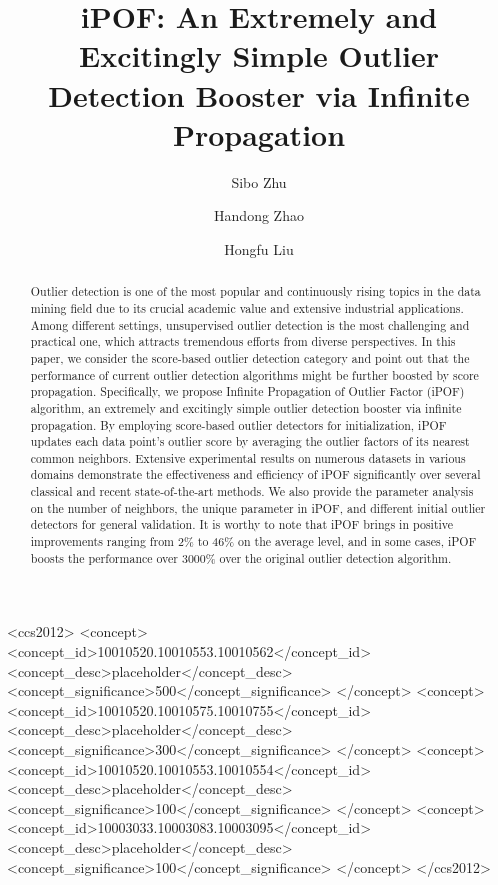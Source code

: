 \documentclass[sigconf,nonacm]{acmart}
\begin{document}
\title{iPOF: An Extremely and Excitingly Simple Outlier Detection Booster via Infinite Propagation}

\author{Sibo Zhu}

\author{Handong Zhao}

\author{Hongfu Liu}

\newcommand{\td}{{\bf\color{red} FIXME~}}
\newcommand{\handong}[1]{ {\color{blue} {[ HD:#1]}} }



\begin{abstract}
Outlier detection is one of the most popular and continuously rising topics in the data mining field due to its crucial academic value and extensive industrial applications. Among different settings, unsupervised outlier detection is the most challenging and practical one, which attracts tremendous efforts from diverse perspectives. In this paper, we consider the score-based outlier detection category and point out that the performance of current outlier detection algorithms might be further boosted by score propagation. Specifically, we propose Infinite Propagation of Outlier Factor (iPOF) algorithm, an extremely and excitingly simple outlier detection booster via infinite propagation. By employing score-based outlier detectors for initialization, iPOF updates each data point's outlier score by averaging the outlier factors of its nearest common neighbors. Extensive experimental results on numerous datasets in various domains demonstrate the effectiveness and efficiency of iPOF significantly over several classical and recent state-of-the-art methods. We also provide the parameter analysis on the number of neighbors, the unique parameter in iPOF, and different initial outlier detectors for general validation. It is worthy to note that iPOF brings in positive improvements ranging from 2\% to 46\% on the average level, and in some cases, iPOF boosts the performance over 3000\% over the original outlier detection algorithm. 
\end{abstract}

\begin{CCSXML}
<ccs2012>
 <concept>
  <concept_id>10010520.10010553.10010562</concept_id>
  <concept_desc>placeholder</concept_desc>
  <concept_significance>500</concept_significance>
 </concept>
 <concept>
  <concept_id>10010520.10010575.10010755</concept_id>
  <concept_desc>placeholder</concept_desc>
  <concept_significance>300</concept_significance>
 </concept>
 <concept>
  <concept_id>10010520.10010553.10010554</concept_id>
  <concept_desc>placeholder</concept_desc>
  <concept_significance>100</concept_significance>
 </concept>
 <concept>
  <concept_id>10003033.10003083.10003095</concept_id>
  <concept_desc>placeholder</concept_desc>
  <concept_significance>100</concept_significance>
 </concept>
</ccs2012>
\end{CCSXML}
\end{document}
